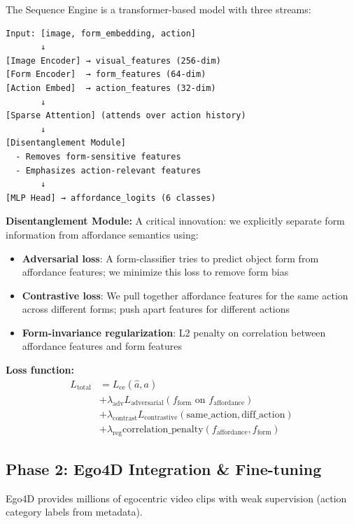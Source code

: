\documentclass[11pt]{article}
\begin{document}
The Sequence Engine is a transformer-based model with three streams:

\begin{verbatim}
Input: [image, form_embedding, action]
       ↓
[Image Encoder] → visual_features (256-dim)
[Form Encoder]  → form_features (64-dim)
[Action Embed]  → action_features (32-dim)
       ↓
[Sparse Attention] (attends over action history)
       ↓
[Disentanglement Module]
  - Removes form-sensitive features
  - Emphasizes action-relevant features
       ↓
[MLP Head] → affordance_logits (6 classes)
\end{verbatim}

\textbf{Disentanglement Module:}
A critical innovation: we explicitly separate form information from affordance semantics using:
\begin{itemize}
    \item \textbf{Adversarial loss}: A form-classifier tries to predict object form from affordance features; we minimize this loss to remove form bias
    \item \textbf{Contrastive loss}: We pull together affordance features for the same action across different forms; push apart features for different actions
    \item \textbf{Form-invariance regularization}: L2 penalty on correlation between affordance features and form features
\end{itemize}

\textbf{Loss function:}
\begin{equation}
\begin{split}
L_{\text{total}} &= L_{\text{ce}}(\hat{a}, a) \\
&+ \lambda_{\text{adv}} L_{\text{adversarial}}(f_{\text{form}} \text{ on } f_{\text{affordance}}) \\
&+ \lambda_{\text{contrast}} L_{\text{contrastive}}(\text{same\_action}, \text{diff\_action}) \\
&+ \lambda_{\text{reg}} \text{correlation\_penalty}(f_{\text{affordance}}, f_{\text{form}})
\end{split}
\end{equation}

\subsection{Phase 2: Ego4D Integration \& Fine-tuning}

Ego4D provides millions of egocentric video clips with weak supervision (action category labels from metadata).
\end{document}
